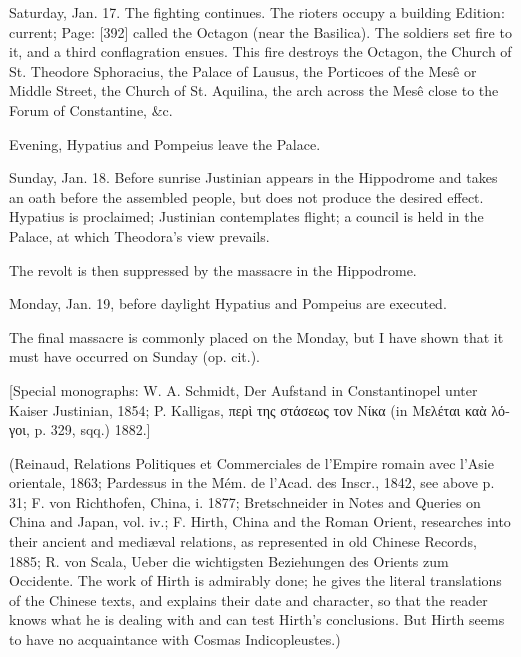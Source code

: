 Saturday, Jan. 17. The fighting continues. The rioters occupy a building Edition: current; Page: [392] called the Octagon (near the Basilica). The soldiers set fire to it, and a third conflagration ensues. This fire destroys the Octagon, the Church of St. Theodore Sphoracius, the Palace of Lausus, the Porticoes of the Mesê or Middle Street, the Church of St. Aquilina, the arch across the Mesê close to the Forum of Constantine, \&c.

Evening, Hypatius and Pompeius leave the Palace.

Sunday, Jan. 18. Before sunrise Justinian appears in the Hippodrome and takes an oath before the assembled people, but does not produce the desired effect. Hypatius is proclaimed; Justinian contemplates flight; a council is held in the Palace, at which Theodora\texthebrew{}’s view prevails.

The revolt is then suppressed by the massacre in the Hippodrome.

Monday, Jan. 19, before daylight Hypatius and Pompeius are executed.

The final massacre is commonly placed on the Monday, but I have shown that it must have occurred on Sunday (op. cit.).

[Special monographs: W. A. Schmidt, Der Aufstand in Constantinopel unter Kaiser Justinian, 1854; P. Kalligas, \textgreek{περ\texthebrew{ὶ} της στάσεως τον Νίκα} (in \textgreek{Μελέται κα\texthebrew{ὰ} λόγοι}, p. 329, sqq.) 1882.]


(Reinaud, Relations Politiques et Commerciales de l\texthebrew{}’Empire romain avec l\texthebrew{}’Asie orientale, 1863; Pardessus in the Mém. de l\texthebrew{}’Acad. des Inscr., 1842, see above p. 31; F. von Richthofen, China, i. 1877; Bretschneider in Notes and Queries on China and Japan, vol. iv.; F. Hirth, China and the Roman Orient, researches into their ancient and mediæval relations, as represented in old Chinese Records, 1885; R. von Scala, Ueber die wichtigsten Beziehungen des Orients zum Occidente. The work of Hirth is admirably done; he gives the literal translations of the Chinese texts, and explains their date and character, so that the reader knows what he is dealing with and can test Hirth\texthebrew{}’s conclusions. But Hirth seems to have no acquaintance with Cosmas Indicopleustes.)

